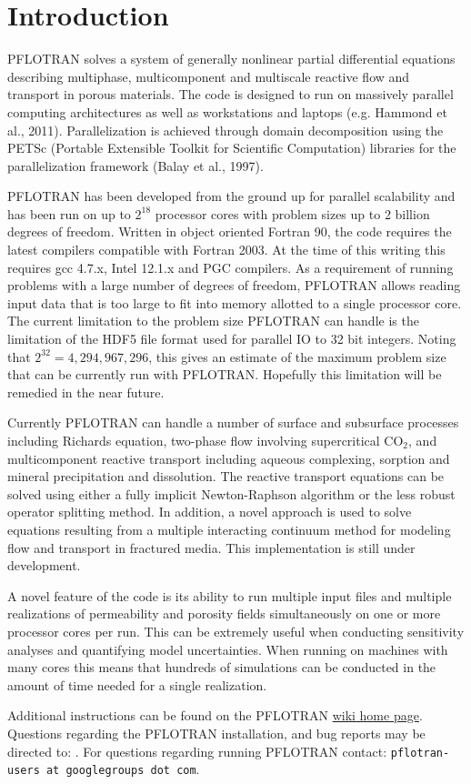 
\section{Introduction}

PFLOTRAN solves a system of generally nonlinear partial differential equations describing multiphase, multicomponent and multiscale reactive flow and transport in porous materials. The code is designed to run on massively parallel computing architectures as well as workstations and laptops (e.g. Hammond et al., 2011). Parallelization is achieved through domain decomposition using the PETSc (Port\-a\-ble Extensible Toolkit for Scientific Computation) libraries for the parallelization framework (Balay et al., 1997). 

PFLOTRAN has been developed from the ground up for parallel scalability and has been run on up to $2^{18}$ processor cores with problem sizes up to 2 billion degrees of freedom. Written in object oriented Fortran 90, the code requires the latest compilers compatible with Fortran 2003. At the time of this writing this requires gcc 4.7.x, Intel 12.1.x and PGC compilers. As a requirement of running problems with a large number of degrees of freedom, PFLOTRAN allows reading input data that is too large to fit into memory allotted to a single processor core. The current limitation to the problem size PFLOTRAN can handle is the limitation of the HDF5 file format used for parallel IO to 32 bit integers. Noting that $2^{32} = 4,294,967,296$, this gives an estimate of the maximum problem size that can be currently run with PFLOTRAN. Hopefully this limitation will be remedied in the near future.

Currently PFLOTRAN can handle a number of surface and subsurface processes including Richards equation, two-phase flow involving supercritical CO$_2$, and multicomponent reactive transport including aqueous complexing, sorption and mineral precipitation and dissolution. The reactive transport equations can be solved using either a fully implicit Newton-Raphson algorithm or the less robust operator splitting method. In addition, a novel approach is used to solve equations resulting from a multiple interacting continuum method for modeling flow and transport in fractured media. This implementation is still under development.

A novel feature of the code is its ability to run multiple input files and multiple realizations of permeability and porosity fields simultaneously on one or more processor cores per run. This can be extremely useful when conducting sensitivity analyses and quantifying model uncertainties. When running on machines with many cores this means that hundreds of simulations can be conducted in the amount of time needed for a single realization.

Additional instructions can be found on the PFLOTRAN \href{https://bitbucket.org/pflotran/pflotran-dev/wiki/Home}{wiki home page}.
Questions regarding the PFLOTRAN installation, and bug reports may be directed to: .
For questions regarding running PFLOTRAN contact: {\footnotesize\tt pflotran-users at googlegroups dot com}.
